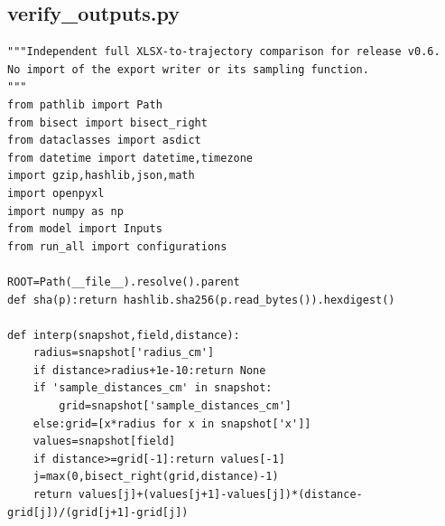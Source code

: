 \subsection{verify\_outputs.py}
\begin{verbatim}
"""Independent full XLSX-to-trajectory comparison for release v0.6.
No import of the export writer or its sampling function.
"""
from pathlib import Path
from bisect import bisect_right
from dataclasses import asdict
from datetime import datetime,timezone
import gzip,hashlib,json,math
import openpyxl
import numpy as np
from model import Inputs
from run_all import configurations

ROOT=Path(__file__).resolve().parent
def sha(p):return hashlib.sha256(p.read_bytes()).hexdigest()

def interp(snapshot,field,distance):
    radius=snapshot['radius_cm']
    if distance>radius+1e-10:return None
    if 'sample_distances_cm' in snapshot:
        grid=snapshot['sample_distances_cm']
    else:grid=[x*radius for x in snapshot['x']]
    values=snapshot[field]
    if distance>=grid[-1]:return values[-1]
    j=max(0,bisect_right(grid,distance)-1)
    return values[j]+(values[j+1]-values[j])*(distance-grid[j])/(grid[j+1]-grid[j])


\end{verbatim}
